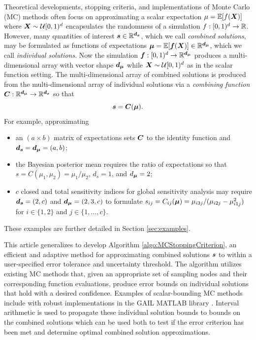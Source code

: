 \documentclass{article}[12pt]
\begin{document}
Theoretical developments, stopping criteria, and implementations of Monte Carlo (MC) methods often focus on approximating a scalar expectation $\mu = \mathbb{E}[f(\boldsymbol{X})]$ where $\boldsymbol{X} \sim \mathcal{U}[0,1)^d$ encapsulates the randomness of a simulation $f: [0,1)^d \to \mathbb{R}$. However, many quantities of interest $\boldsymbol{s} \in \mathbb{R}^{\boldsymbol{d}_{\boldsymbol{s}}}$, which we call \emph{combined solutions}, may be formulated as functions of expectations $\boldsymbol{\mu} = \mathbb{E}[\boldsymbol{f}(\boldsymbol{X})] \in \mathbb{R}^{\boldsymbol{d}_{\boldsymbol{\mu}}}$, which we call \emph{individual solutions}. Now the simulation $\boldsymbol{f}: [0,1)^{d} \to \mathbb{R}^{\boldsymbol{d}_{\boldsymbol{\mu}}}$ produces a multi-dimensional array with vector shape $\boldsymbol{d}_{\boldsymbol{\mu}}$ while $\boldsymbol{X} \sim \mathcal{U}[0,1)^d$ as in the scalar function setting. The multi-dimensional array of combined solutions is produced from the multi-dimensional array of individual solutions via a \emph{combining function} $\boldsymbol{C}: \mathbb{R}^{\boldsymbol{d}_{\boldsymbol{\mu}}} \to \mathbb{R}^{\boldsymbol{d}_{\boldsymbol{s}}}$ so that 
\begin{equation}
    \boldsymbol{s} = \boldsymbol{C}(\boldsymbol{\mu}).
    \label{eq:comb_from_indv}
\end{equation}
For example, approximating
\begin{itemize}
    \item an $(a \times b)$ matrix of expectations sets $\boldsymbol{C}$ to the identity function and $\boldsymbol{d}_{\boldsymbol{s}} = \boldsymbol{d}_{\boldsymbol{\mu}} = (a,b)$;
    \item the Bayesian posterior mean requires the ratio of expectations so that $s = C(\mu_1,\mu_2) = \mu_1/\mu_2$, $d_s = 1$, and $d_{\boldsymbol{\mu}} = 2$;
    \item $c$ closed and total sensitivity indices for global sensitivity analysis may require $\boldsymbol{d}_{\boldsymbol{s}} = (2,c)$ and $\boldsymbol{d}_{\boldsymbol{\mu}} = (2,3,c)$ to formulate $s_{ij} = C_{ij}(\boldsymbol{\mu}) =  \mu_{i3j}/(\mu_{i2j}-\mu_{i1j}^2)$ for $i \in \{1,2\}$ and $j \in \{1,\dots,c\}$.
\end{itemize}
These examples are further detailed in Section \ref{sec:examples}.

This article generalizes \cite{adaptive_qmc} to develop Algorithm \ref{algo:MCStoppingCriterion}, an efficient and adaptive method for approximating combined solutions $\boldsymbol{s}$ to within a user-specified error tolerance and uncertainty threshold. The algorithm utilizes existing MC  methods that, given an appropriate set of sampling nodes and their corresponding function evaluations, produce error bounds on individual solutions that hold with a desired confidence. Examples of scalar-bounding MC methods include \cite{cubmcg,cubqmclattice,cubqmcsobol,cubqmcbayes_thesis,cubqmcbayeslattice} with robust implementations in the GAIL MATLAB library \cite{GAIL}. Interval arithmetic is used to propagate these individual solution bounds to bounds on the combined solutions which can be used both to test if the error criterion has been met and determine optimal combined solution approximations. 
\end{document}
